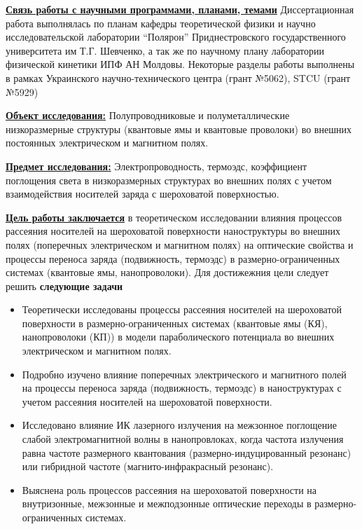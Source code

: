 \underline{\textbf{Связь работы с научными программами, планами, темами}}
Диссертационная работа выполнялась по планам кафедры теоретической физики и научно исследовательской лаборатории “Полярон” Приднестровского государственного университета им Т.Г. Шевченко, а так же по научному плану лаборатории физической кинетики ИПФ АН Молдовы. Некоторые разделы работы выполнены в рамках Украинского научно-технического центра (грант №5062), STCU (грант №5929)

\underline{\textbf{Объект исследования:}} Полупроводниковые и полуметаллические низкоразмерные структуры (квантовые ямы и квантовые проволоки) во внешних постоянных электрическом и магнитном полях.

\underline{\textbf{Предмет исследования:}} Электропроводность, термоэдс, коэффициент поглощения света в низкоразмерных структурах во внешних полях с учетом взаимодействия носителей заряда с шероховатой поверхностью.

\underline{\textbf{Цель работы заключается}}
в теоретическом исследовании влияния процессов рассеяния носителей на шероховатой поверхности наноструктуры во внешних полях (поперечных электрическом и магнитном полях) на оптические свойства и процессы переноса заряда (подвижность, термоэдс) в размерно-ограниченных системах (квантовые ямы, нанопроволоки). Для достижежния цели следует решить \textbf{следующие задачи}
\begin{itemize}
	\item Теоретически исследованы процессы рассеяния носителей на шероховатой поверхности в размерно-ограниченных системах (квантовые ямы (КЯ), нанопроволоки (КП)) в модели параболического потенциала во внешних электрическом и магнитном полях.
	\item Подробно изучено влияние поперечных электрического и магнитного полей на процессы переноса заряда (подвижность, термоэдс) в наноструктурах с учетом рассеяния носителей на шероховатой поверхности.
	\item Исследовано влияние ИК лазерного излучения на межзонное поглощение слабой электромагнитной волны в нанопровлоках, когда частота излучения равна частоте размерного квантования (размерно-индуцированный резонанс) или гибридной частоте (магнито-инфракрасный резонанс).
	\item Выяснена роль процессов рассеяния на шероховатой поверхности на внутризонные, межзонные и межподзонные оптические переходы в размерно-ограниченных системах.
\end{itemize}

